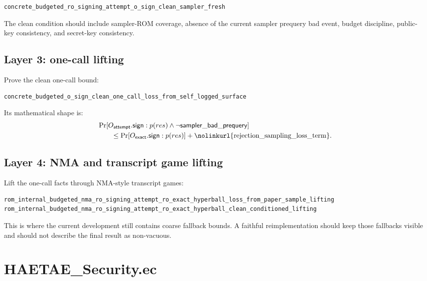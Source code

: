 \documentclass[11pt]{report}
\DeclareRobustCommand{\ec}[1]{\ifmmode\text{\nolinkurl{#1}}\else\nolinkurl{#1}\fi}
\newcommand{\Prb}{\Pr}
\theoremstyle{definition}
\theoremstyle{plain}
\begin{document}
\begin{lstlisting}[language=EasyCrypt]
concrete_budgeted_ro_signing_attempt_o_sign_clean_sampler_fresh
\end{lstlisting}

The clean condition should include sampler-ROM coverage, absence of the
current sampler prequery bad event, budget discipline, public-key consistency,
and secret-key consistency.

\subsection*{Layer 3: one-call lifting}

Prove the clean one-call bound:

\begin{lstlisting}[language=EasyCrypt]
concrete_budgeted_o_sign_clean_one_call_loss_from_self_logged_surface
\end{lstlisting}

Its mathematical shape is:
\[
\begin{aligned}
&\Prb[O_{\mathsf{attempt}}.\mathsf{sign}:p(res)\wedge
  \neg\mathsf{sampler\_bad\_prequery}]\\
&\qquad\le
  \Prb[O_{\mathsf{exact}}.\mathsf{sign}:p(res)]
  + \ec{rejection\_sampling\_loss\_term}.
\end{aligned}
\]

\subsection*{Layer 4: NMA and transcript game lifting}

Lift the one-call facts through NMA-style transcript games:

\begin{lstlisting}[language=EasyCrypt]
rom_internal_budgeted_nma_ro_signing_attempt_ro_exact_hyperball_loss_from_paper_sample_lifting
rom_internal_budgeted_nma_ro_signing_attempt_ro_exact_hyperball_clean_conditioned_lifting
\end{lstlisting}

This is where the current development still contains coarse fallback bounds.
A faithful reimplementation should keep those fallbacks visible and should not
describe the final result as non-vacuous.

\section{HAETAE\_Security.ec}
\end{document}

